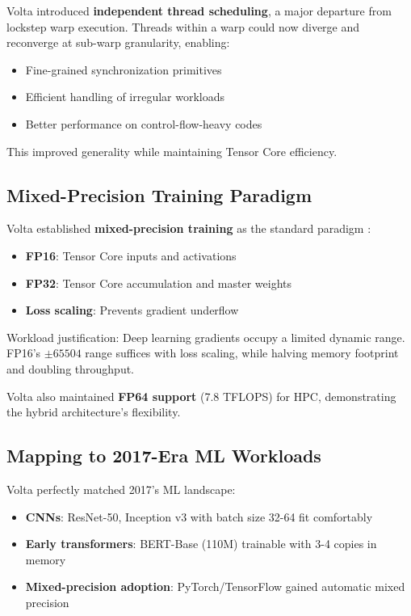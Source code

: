 \documentclass{article}
\begin{document}
Volta introduced \textbf{independent thread scheduling}, a major departure from lockstep warp execution. Threads within a warp could now diverge and reconverge at sub-warp granularity, enabling:
\begin{itemize}
\item Fine-grained synchronization primitives
\item Efficient handling of irregular workloads
\item Better performance on control-flow-heavy codes
\end{itemize}

This improved generality while maintaining Tensor Core efficiency.

\subsection{Mixed-Precision Training Paradigm}

Volta established \textbf{mixed-precision training} as the standard paradigm \cite{micikevicius2017mixed}:
\begin{itemize}
\item \textbf{FP16}: Tensor Core inputs and activations
\item \textbf{FP32}: Tensor Core accumulation and master weights
\item \textbf{Loss scaling}: Prevents gradient underflow
\end{itemize}

Workload justification: Deep learning gradients occupy a limited dynamic range. FP16's $\pm 65504$ range suffices with loss scaling, while halving memory footprint and doubling throughput.

Volta also maintained \textbf{FP64 support} (7.8 TFLOPS) for HPC, demonstrating the hybrid architecture's flexibility.

\subsection{Mapping to 2017-Era ML Workloads}

Volta perfectly matched 2017's ML landscape:
\begin{itemize}
\item \textbf{CNNs}: ResNet-50, Inception v3 with batch size 32-64 fit comfortably
\item \textbf{Early transformers}: BERT-Base (110M) trainable with 3-4 copies in memory
\item \textbf{Mixed-precision adoption}: PyTorch/TensorFlow gained automatic mixed precision
\end{itemize}
\end{document}
